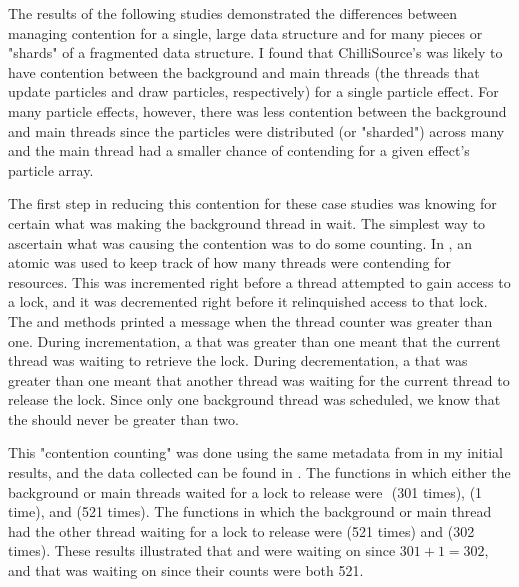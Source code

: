 The results of the following studies demonstrated the differences between managing contention for a single, large data structure and for many pieces or "shards" of a fragmented data structure. I found that ChilliSource's  was likely to have contention between the background and main threads (the threads that update particles and draw particles, respectively) for a single particle effect. For many particle effects, however, there was less contention between the background and main threads since the particles were distributed (or "sharded") across many  and the main thread had a smaller chance of contending for a given effect's particle array.

The first step in reducing this contention for these case studies was knowing for certain what was making the background thread in  wait. The simplest way to ascertain what was causing the contention was to do some counting. In , an atomic  was used to keep track of how many threads were contending for resources. This  was incremented right before a thread attempted to gain access to a lock, and it was decremented right before it relinquished access to that lock. The  and  methods printed a message when the thread counter was greater than one. During incrementation, a  that was greater than one meant that the current thread was waiting to retrieve the lock. During decrementation, a  that was greater than one meant that another thread was waiting for the current thread to release the lock. Since only one background thread was scheduled, we know that the  should never be greater than two.

This "contention counting" was done using the same metadata from  in my initial results, and the data collected can be found in . The functions in which either the background or main threads waited for a lock to release were \footnotemark $ $ (301 times),  (1 time), and  (521 times). The functions in which the background or main thread had the other thread waiting for a lock to release were  (521 times) and  (302 times). These results illustrated that  and  were waiting on  since $ 301 + 1 = 302 $, and that  was waiting on  since their counts were both 521.

